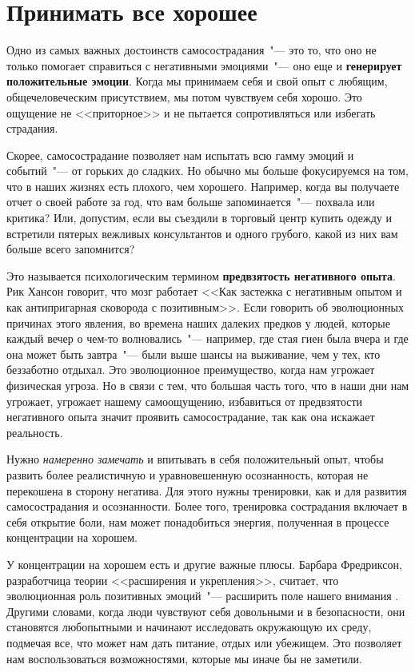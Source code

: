 
\chapter{Принимать все хорошее} \label{Embracing_the_Good}

Одно из самых важных достоинств самосострадания~"--- это то, что оно не только помогает справиться с негативными эмоциями~"--- оно еще и \textbf{генерирует положительные эмоции}\cite{114}. Когда мы принимаем себя и свой опыт с любящим, общечеловеческим присутствием, мы потом чувствуем себя хорошо. Это ощущение не <<приторное>> и не пытается сопротивляться или избегать страдания. 

Скорее, самосострадание позволяет нам испытать всю гамму эмоций и событий~"--- от горьких до сладких. Но обычно мы больше фокусируемся на том, что в наших жизнях есть плохого, чем хорошего. Например, когда вы получаете отчет о своей работе за год, что вам больше запоминается~"--- похвала или критика? Или, допустим, если вы съездили в торговый центр купить одежду и встретили пятерых вежливых консультантов и одного грубого, какой из них вам больше всего запомнится?

Это называется психологическим термином \textbf{предвзятость негативного опыта}\cite{115}. Рик Хансон говорит, что мозг работает <<Как застежка с негативным опытом и как антипригарная сковорода с позитивным>>\cite{116}. Если говорить об эволюционных причинах этого явления, во времена наших далеких предков у  людей, которые каждый вечер о чем-то волновались~"--- например, где стая гиен была вчера и где она может быть завтра~"--- были выше шансы на выживание, чем у тех, кто беззаботно отдыхал. Это эволюционное преимущество, когда нам угрожает физическая угроза. Но в связи с тем, что большая часть того, что в наши дни нам угрожает, угрожает нашему самоощущению, избавиться от предвзятости негативного опыта значит проявить самосострадание, так как она искажает реальность.  

Нужно \emph{намеренно замечать} и впитывать в себя положительный опыт, чтобы развить более реалистичную и уравновешенную осознанность, которая не перекошена в сторону негатива\cite{117}. Для этого нужны тренировки, как и для развития самосострадания и осознанности. Более того, тренировка сострадания включает в себя открытие боли, нам может понадобиться энергия, полученная в процессе концентрации на хорошем.  

У концентрации на хорошем есть и другие важные плюсы. Барбара Фредриксон, разработчица теории <<расширения и укрепления>>, считает, что эволюционная роль позитивных эмоций~"--- расширить поле нашего внимания \cite{118}. Другими словами, когда люди чувствуют себя довольными и в безопасности, они становятся любопытными и начинают исследовать окружающую их среду, подмечая все, что может нам дать питание, отдых или убежищем. Это позволяет нам воспользоваться возможностями, которые мы иначе бы не заметили.  

